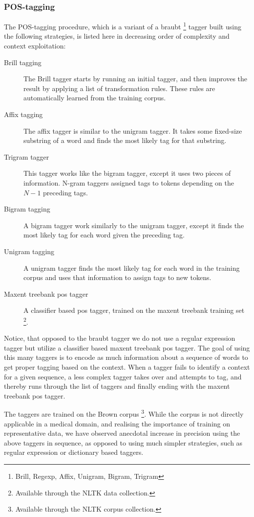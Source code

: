 \documentclass[10pt,letterpaper,final]{article}
\begin{document}
\subsubsection{POS-tagging}
The POS-tagging procedure, which is a variant of a braubt
\footnote{Brill, Regexp, Affix, Unigram, Bigram, Trigram} tagger built
using the following strategies, is listed here in decreasing order of
complexity and context exploitation:
\begin{description}
\item[Brill tagging] The Brill \cite{Brill:1992:SRP:974499.974526}
tagger starts by running an initial tagger, and then improves the result
by applying a list of transformation rules. These rules are
automatically learned from the training corpus.
\item[Affix tagging] The affix tagger is similar to the unigram tagger.
It takes some fixed-size substring of a word and finds the most likely
tag for that substring.
\item[Trigram tagger] This tagger works like the bigram tagger, except it
uses two pieces of information. N-gram taggers assigned tags to tokens
depending on the $N - 1$ preceding tags.
\item[Bigram tagging] A bigram tagger work similarly to the unigram
tagger, except it finds the most likely tag for each word given the
preceding tag.
\item[Unigram tagging] A unigram tagger finds the most likely tag for each word
in the training corpus and uses that information to assign tags to new
tokens.
\item[Maxent treebank pos tagger] A classifier based pos tagger, trained
on the maxent treebank training set \footnote{Available through the NLTK
data collection.}.
\end{description}
Notice, that opposed to the
braubt tagger we do not use a regular expression tagger but utilize a
classifier based maxent treebank pos tagger. The goal of using this many
taggers is to encode as much information about a sequence of words to
get proper tagging based on the context. When a tagger fails to identify
a context for a given sequence, a less complex tagger takes over and
attempts to tag, and thereby runs through the list of taggers and
finally ending with the maxent treebank pos tagger.

The taggers are trained on the Brown corpus \footnote{Available through
the NLTK corpus collection.}. While the corpus is not directly
applicable in a medical domain, and realising the importance of training
on representative data, we have observed anecdotal increase in precision
using the above taggers in sequence, as opposed to using much simpler
strategies, such as regular expression or dictionary based taggers.
\end{document}
